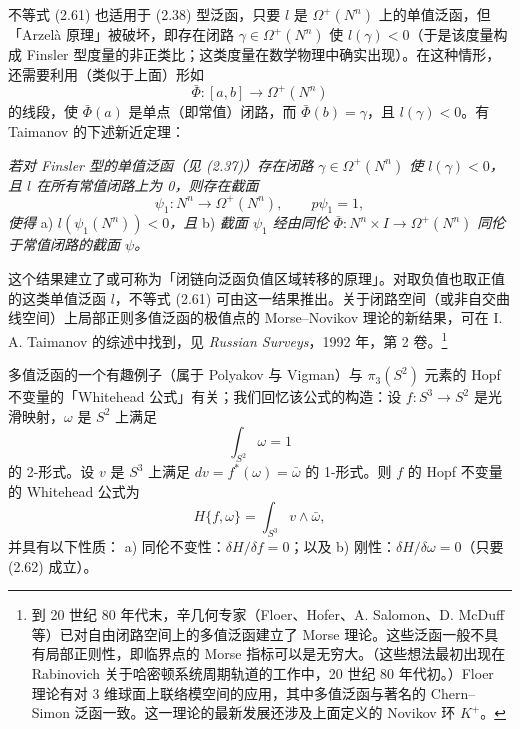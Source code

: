 不等式 (2.61) 也适用于 (2.38) 型泛函，只要 $l$ 是 $\Omega^+(N^n)$ 上的单值泛函，但「Arzelà 原理」被破坏，即存在闭路 $\gamma\in\Omega^+(N^n)$ 使 $l(\gamma)<0$（于是该度量构成 Finsler 型度量的非正类比；这类度量在数学物理中确实出现）。在这种情形，还需要利用（类似于上面）形如
\[
  \bar\Phi:[a,b]\to\Omega^+(N^n)
\]
的线段，使 $\bar\Phi(a)$ 是单点（即常值）闭路，而 $\bar\Phi(b)=\gamma$，且 $l(\gamma)<0$。有 Taimanov 的下述新近定理：

\emph{若对 Finsler 型的单值泛函（见 (2.37)）存在闭路 $\gamma\in\Omega^+(N^n)$ 使 $l(\gamma)<0$，且 $l$ 在所有常值闭路上为 0，则存在截面}
\[
  \psi_1:N^n\to\Omega^+(N^n),\qquad p\psi_1=1,
\]
\emph{使得}
a) \emph{$l(\psi_1(N^n))<0$，且}
b) \emph{截面 $\psi_1$ 经由同伦 $\bar\Phi:N^n\times I\to\Omega^+(N^n)$ 同伦于常值闭路的截面 $\psi$。}

这个结果建立了或可称为「闭链向泛函负值区域转移的原理」。对取负值也取正值的这类单值泛函 $l$，不等式 (2.61) 可由这一结果推出。关于闭路空间（或非自交曲线空间）上局部正则多值泛函的极值点的 Morse--Novikov 理论的新结果，可在 I. A. Taimanov 的综述中找到，见 \emph{Russian Surveys}，1992 年，第 2 卷。\footnote{到 20 世纪 80 年代末，辛几何专家（Floer、Hofer、A. Salomon、D. McDuff 等）已对自由闭路空间上的多值泛函建立了 Morse 理论。这些泛函一般不具有局部正则性，即临界点的 Morse 指标可以是无穷大。（这些想法最初出现在 Rabinovich 关于哈密顿系统周期轨道的工作中，20 世纪 80 年代初。）Floer 理论有对 3 维球面上联络模空间的应用，其中多值泛函与著名的 Chern--Simon 泛函一致。这一理论的最新发展还涉及上面定义的 Novikov 环 $K^+$。}

多值泛函的一个有趣例子（属于 Polyakov 与 Vigman）与 $\pi_3(S^2)$ 元素的 Hopf 不变量的「Whitehead 公式」有关；我们回忆该公式的构造：设 $f:S^3\to S^2$ 是光滑映射，$\omega$ 是 $S^2$ 上满足
\begin{equation}
  \int_{S^2}\omega=1 \tag{2.62}
\end{equation}
的 2-形式。设 $v$ 是 $S^3$ 上满足 $dv=f^*(\omega)=\bar\omega$ 的 1-形式。则 $f$ 的 Hopf 不变量的 Whitehead 公式为
\begin{equation}
  H\{f,\omega\}=\int_{S^3}v\wedge\bar\omega, \tag{2.63}
\end{equation}
并具有以下性质：
a) 同伦不变性：$\delta H/\delta f=0$；以及
b) 刚性：$\delta H/\delta\omega=0$（只要 (2.62) 成立）。

